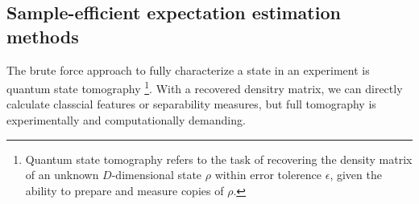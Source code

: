 \documentclass[
aps,
pra,
twocolumn,
floatfix,
]{revtex4-2}
\theoremstyle{plain}
\theoremstyle{definition}
\newtheorem{problem}{Problem}
\newcommand{\dm}{\rho}
\begin{document}
\subsection{Sample-efficient expectation estimation methods}\label{sec:estimation}
The brute force approach to fully characterize a state in an experiment is quantum state tomography \cite{altepeterPhotonicStateTomography2005}
\footnote{Quantum state tomography refers to the task of recovering the density matrix of an unknown $D$-dimensional state $\dm$ within error tolerence $\epsilon$, 
given the ability to prepare and measure copies of $\dm$.}.
With a recovered densitry matrix, we can directly calculate classcial features or separability measures,
but full tomography is experimentally and computationally demanding.
\end{document}
